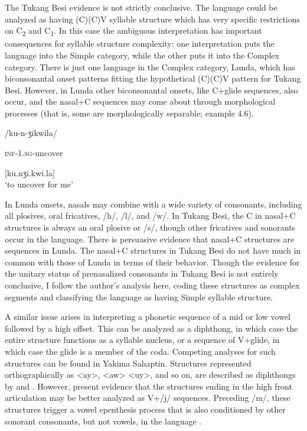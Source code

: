   The Tukang Besi evidence is not strictly conclusive. The language could be analyzed as having (C)(C)V syllable structure which has very specific restrictions on C\textsubscript{2} and C\textsubscript{1}. In this case the ambiguous interpretation has important consequences for syllable structure complexity: one interpretation puts the language into the Simple category, while the other puts it into the Complex category. There is just one language in the Complex category, Lunda, which has biconsonantal onset patterns fitting the hypothetical (C)(C)V pattern for Tukang Besi. However, in Lunda other biconsonantal onsets, like C+glide sequences, also occur, and the nasal+C sequences may come about through morphological processes (that is, some are morphologically separable; example 4.6).

\ea\label{ex:4.6}

/ku-n-ʒikwila/

\textsc{inf}-\textsc{1.sg}-uncover

[ku.nʒi.kwi.la]\\
\glt ‘to uncover for me’
\citep[24]{Kawasha2003}
\z

In Lunda onsets, nasals may combine with a wide variety of consonants, including all plosives, oral fricatives, /h/, /l/, and /w/. In Tukang Besi, the C in nasal+C structures is always an oral plosive or /s/, though other fricatives and sonorants occur in the language. There is persuasive evidence that nasal+C structures are sequences in Lunda. The nasal+C structures in Tukang Besi do not have much in common with those of Lunda in terms of their behavior. Though the evidence for the unitary status of prenasalized consonants in Tukang Besi is not entirely conclusive, I follow the author’s analysis here, coding these structures as complex segments and classifying the language as having Simple syllable structure. 

  A similar issue arises in interpreting a phonetic sequence of a mid or low vowel followed by a high offset. This can be analyzed as a diphthong, in which case the entire structure functions as a syllable nucleus, or a sequence of V+glide, in which case the glide is a member of the coda. Competing analyses for such structures can be found in Yakima Sahaptin. Structures represented orthographically as <ay>, <aw> <uy>, and so on, are described as diphthongs by \citet{Jansen2010} and \citet{RigsbyRude1996}. However, \citet{HargusBeavert2006} present evidence that the structures ending in the high front articulation may be better analyzed as V+/j/ sequences. Preceding /m/, these structures trigger a vowel epenthesis process that is also conditioned by other sonorant consonants, but not vowels, in the language .

